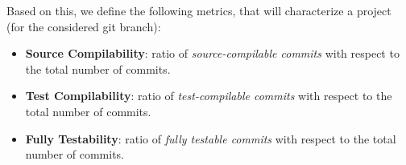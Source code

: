 Based on this, we define the following metrics, that will characterize a project (for the considered git branch):
\begin{itemize}
    \item \textbf{Source Compilability}: ratio of \textit{source-compilable commits} with respect to the total number of commits.
    \item \textbf{Test Compilability}: ratio of \textit{test-compilable commits} with respect to the total number of commits.
    \item \textbf{Fully Testability}: ratio of \textit{fully testable commits} with respect to the total number of commits.
\end{itemize}


